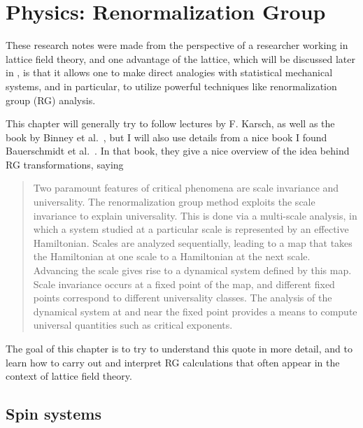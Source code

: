 \chapter{Physics: Renormalization Group}

These research notes were made from the perspective of a researcher working
in lattice field theory, and one advantage of the lattice, which will be
discussed later in , is that it allows one
to make direct analogies with statistical mechanical systems, and in
particular, to utilize powerful techniques like renormalization group (RG)
analysis.

This chapter will generally try to follow 
lectures by F. Karsch, as well as the book by Binney et
al.~\cite{binney_theory_1992}, but I will also use details from a nice
book I found Bauerschmidt et al.~\cite{Bauerschmidt_2019}.
In that book, they give a nice overview of the idea
behind RG transformations, saying
\begin{quote}
Two paramount features of critical phenomena are scale invariance and 
universality. The renormalization group method exploits the scale 
invariance to explain universality. This is done via a multi-scale analysis, 
in which a system studied at a particular scale is represented by an 
effective Hamiltonian. Scales are analyzed sequentially, leading to a map 
that takes the Hamiltonian at one scale to a Hamiltonian at the next scale. 
Advancing the scale gives rise to a dynamical system defined by this map. 
Scale invariance occurs at a fixed point of the map, and different fixed
points correspond to different universality classes. The analysis of the 
dynamical system at and near the fixed point provides a means to compute 
universal quantities such as critical exponents. 
\end{quote} 
\clearpage
The goal of this chapter is to try to understand this quote in more detail,
and to learn how to carry out and interpret RG calculations that often
appear in the context of lattice field theory.

\section{Spin systems}


